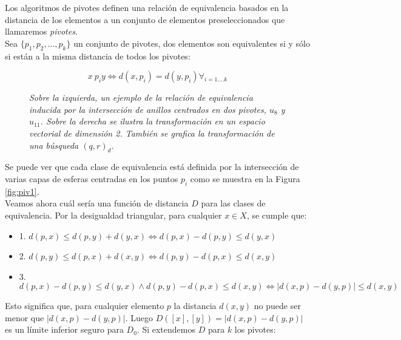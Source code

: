 Los algoritmos de pivotes definen una relaci\'on de equivalencia basados en la distancia de los elementos a un conjunto de elementos preseleccionados que llamaremos \textit{pivotes}.\\

Sea $\{p_1, p_2,...,p_k\}$ un conjunto de pivotes, dos elementos son equivalentes si y s\'olo si est\'an a la misma distancia de todos los pivotes:

\[
x ~ p_i  y \Leftrightarrow d(x,p_i) = d(y,p_i) \forall_{i = 1....k}
\]

\begin{figure}[htb]
\centerline{ %
   \vspace{.2in}
   }
   \caption [Relaci\'on de equivalencia inducida por dos pivotes y su
   correspondiente transformaci\'on en un espacio vectorial]
     {\textsl{\footnotesize{Sobre la izquierda, un ejemplo de la relaci\'on de equivalencia inducida
        por la intersecci\'on de anillos centrados en dos pivotes, $u_8$ y $u_{11}$.
        Sobre la derecha se ilustra la transformaci\'on en un espacio vectorial de dimensi\'on 2.
    	Tambi\'en se grafica la transformaci\'on de una b\'usqueda $(q,r)_d$. }}}
\label{piv1}
\end{figure} 

Se puede ver que cada clase de equivalencia est\'a definida por la intersecci\'on de varias capas de esferas centradas en los puntos $p_i$ como se muestra en la Figura \ref{fig:piv1}.\\

Veamos ahora cu\'al ser\'ia una funci\'on de distancia $D$ para las clases de equivalencia.  
Por la desigualdad triangular, para cualquier $x \in X$, se cumple que:

\begin{itemize}
\item 1. $d(p,x) \leq d(p,y) + d(y,x) \Leftrightarrow d(p,x) - d(p,y) \leq d(y,x)$
\item 2. $d(p,y) \leq d(p,x) + d(x,y) \Leftrightarrow d(p,y) - d(p,x) \leq d(x,y)$
\item 3. $d(p,x) - d(p,y) \leq d(y,x) \wedge d(p,y) - d(p,x) \leq d(x,y) \Leftrightarrow |d(x,p) - d(y,p)| \leq d(x,y)$
\end{itemize}

Esto significa que, para cualquier elemento $p$ la distancia $d(x,y)$ no puede ser menor que  
$|d(x,p) - d(y,p)|$. Luego  $D([x],[y]) = |d(x,p) - d(y,p)|$  es un l\'imite inferior seguro 
para $D_0$. Si extendemos $D$ para $k$ los pivotes:

